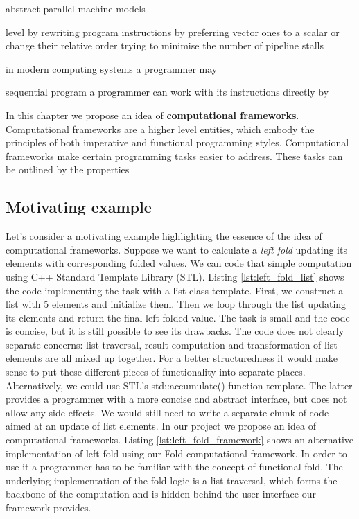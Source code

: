 abstract parallel machine models   

level by rewriting program instructions by preferring vector ones to a scalar or change their relative order trying to minimise the number of pipeline stalls    

in modern computing systems a programmer may 

sequential program a programmer can work with its instructions directly by 

\quad In this chapter we propose an idea of \textbf{computational frameworks}. Computational frameworks are a higher level entities, which embody the principles of both imperative and functional programming styles. Computational frameworks make certain programming tasks easier to address. These tasks can be outlined by the properties 

\subsection{Motivating example}
\label{computational_frameworks_motiva}
\quad Let's consider a motivating example highlighting the essence of the idea of computational frameworks. Suppose we want to calculate a \textit{left fold} updating its elements with corresponding folded values.\newline\null
\quad We can code that simple computation using C++ Standard Template Library (STL). Listing \ref{lst:left_fold_list} shows the code implementing the task with a list class template. First, we construct a list with 5 elements and initialize them. Then we loop through the list updating its elements and return the final left folded value. The task is small and the code is concise, but it is still possible to see its drawbacks. The code does not clearly separate concerns: list traversal, result computation and transformation of list elements are all mixed up together. For a better structuredness it would make sense to put these different pieces of functionality into separate places. Alternatively, we could use STL's std::accumulate() function template. The latter provides a programmer with a more concise and abstract interface, but does not allow any side effects. We would still need to write a separate chunk of code aimed at an update of list elements.\newline\null 
\quad In our project we propose an idea of computational frameworks. Listing \ref{lst:left_fold_framework} shows an alternative implementation of left fold using our Fold computational framework. In order to use it a programmer has to be familiar with the concept of functional fold. The underlying implementation of the fold logic is a list traversal, which forms the backbone of the computation and is hidden behind the user interface our framework provides. 

